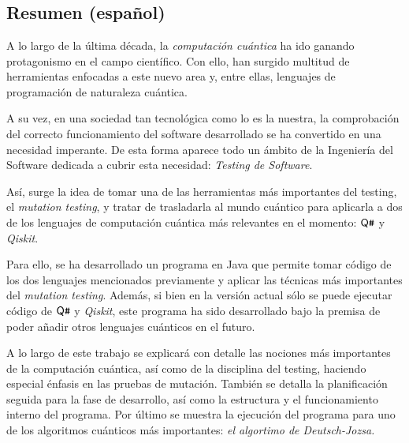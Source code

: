 \chapter*{}

\section*{Resumen (español)}
A lo largo de la última década, la \emph{computación cuántica} ha ido ganando protagonismo en el campo científico. Con ello, han surgido multitud de herramientas enfocadas a este nuevo area y,  entre ellas, lenguajes de programación de naturaleza cuántica.

A su vez, en una sociedad tan tecnológica como lo es la nuestra, la comprobación del correcto funcionamiento del software desarrollado se ha convertido en una necesidad imperante. De esta forma aparece todo un ámbito de la Ingeniería del Software dedicada a cubrir esta necesidad: \emph{Testing de Software}.

Así, surge la idea de tomar una de las herramientas más importantes del testing, el \textit{mutation testing}, y tratar de trasladarla al mundo cuántico para aplicarla a dos de los lenguajes de computación cuántica más relevantes en el momento: $\textsf{Q}\texttt{\#}$  y \textit{Qiskit}.

Para ello, se ha desarrollado un programa en Java que permite tomar código de los dos lenguajes mencionados previamente y aplicar las técnicas más importantes del \textit{mutation testing}. Además, si bien en la versión actual sólo se puede ejecutar código de $\textsf{Q}\texttt{\#}$ y \textit{Qiskit}, este programa ha sido desarrollado bajo la premisa de poder añadir otros lenguajes cuánticos en el futuro.

A lo largo de este trabajo se explicará con detalle las nociones más importantes de la computación cuántica, así como de la disciplina del testing, haciendo especial énfasis en las pruebas de mutación. También se detalla la planificación seguida para la fase de desarrollo, así como la estructura y el funcionamiento interno del programa. Por último se muestra la ejecución del programa para uno de los algoritmos cuánticos más importantes: \textit{el algortimo de Deutsch-Jozsa.}

